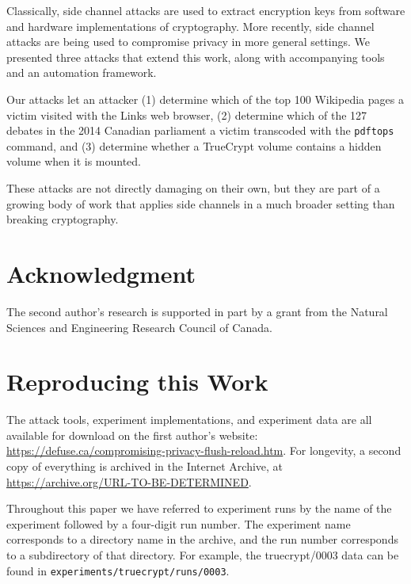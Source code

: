 \documentclass[letterpaper,twocolumn,10pt]{article}
\begin{document}
Classically, side channel attacks are used to extract encryption keys from
software and hardware implementations of cryptography. More recently, side
channel attacks are being used to compromise privacy in more general settings.
We presented three attacks that extend this work, along with accompanying tools
and an automation framework.

Our attacks let an attacker (1) determine which of the top 100 Wikipedia pages
a victim visited with the Links web browser, (2) determine which of the 127
debates in the 2014 Canadian parliament a victim transcoded with the
\texttt{pdftops} command, and (3) determine whether a TrueCrypt volume contains
a hidden volume when it is mounted.

These attacks are not directly damaging on their own, but they are part of a growing
body of work that applies side channels in a much broader setting than breaking
cryptography. 

\section*{Acknowledgment}

The second author's research is supported in part by a grant from the
Natural Sciences and Engineering Research Council of Canada.

{\footnotesize 
}

\appendix
\section{Reproducing this Work}
\label{sec:reproducing}

The attack tools, experiment implementations, and experiment data are all
available for download on the first author's website:
\url{https://defuse.ca/compromising-privacy-flush-reload.htm}.
For longevity, a second copy of everything is archived in the Internet
Archive, at
\url{https://archive.org/URL-TO-BE-DETERMINED}.

Throughout this paper we have referred to experiment runs by the name of the
experiment followed by a four-digit run number. The experiment name
corresponds to a directory name in the archive, and the run number
corresponds to a subdirectory of that directory. For example, the
truecrypt/0003 data can be found in
\texttt{experiments/truecrypt/runs/0003}.
\end{document}
